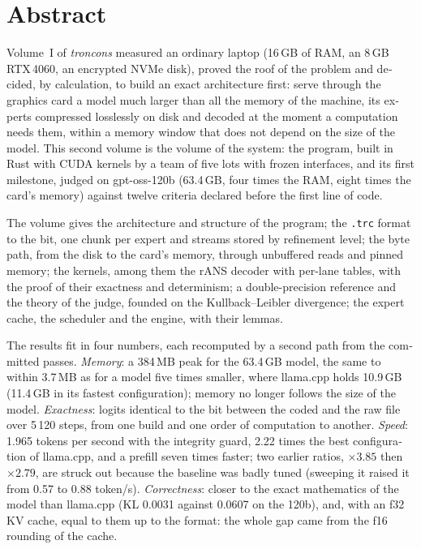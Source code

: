 
\chapter*{Abstract}
\begin{otherlanguage}{english}
Volume~I of \emph{troncons} measured an ordinary laptop (16\,GB of RAM, an 8\,GB RTX\,4060, an encrypted NVMe disk), proved the roof of the problem and decided, by calculation, to build an exact architecture first: serve through the graphics card a model much larger than all the memory of the machine, its experts compressed losslessly on disk and decoded at the moment a computation needs them, within a memory window that does not depend on the size of the model. This second volume is the volume of the system: the program, built in Rust with CUDA kernels by a team of five lots with frozen interfaces, and its first milestone, judged on gpt-oss-120b (63.4\,GB, four times the RAM, eight times the card's memory) against twelve criteria declared before the first line of code.

The volume gives the architecture and structure of the program; the \texttt{.trc} format to the bit, one chunk per expert and streams stored by refinement level; the byte path, from the disk to the card's memory, through unbuffered reads and pinned memory; the kernels, among them the rANS decoder with per-lane tables, with the proof of their exactness and determinism; a double-precision reference and the theory of the judge, founded on the Kullback--Leibler divergence; the expert cache, the scheduler and the engine, with their lemmas.

The results fit in four numbers, each recomputed by a second path from the committed passes. \emph{Memory}: a 384\,MB peak for the 63.4\,GB model, the same to within 3.7\,MB as for a model five times smaller, where llama.cpp holds 10.9\,GB (11.4\,GB in its fastest configuration); memory no longer follows the size of the model. \emph{Exactness}: logits identical to the bit between the coded and the raw file over 5\,120 steps, from one build and one order of computation to another. \emph{Speed}: 1.965 tokens per second with the integrity guard, 2.22 times the best configuration of llama.cpp, and a prefill seven times faster; two earlier ratios, $\times 3.85$ then $\times 2.79$, are struck out because the baseline was badly tuned (sweeping it raised it from 0.57 to 0.88 token/s). \emph{Correctness}: closer to the exact mathematics of the model than llama.cpp (KL 0.0031 against 0.0607 on the 120b), and, with an f32 KV cache, equal to them up to the format: the whole gap came from the f16 rounding of the cache.


\end{otherlanguage}
